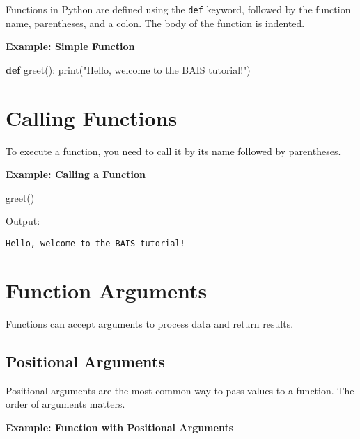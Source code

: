 \documentclass[
  letterpaper,
  DIV=11,
  numbers=noendperiod]{scrreprt}
\newenvironment{Shaded}{\begin{snugshade}}{\end{snugshade}}
\newcommand{\BuiltInTok}[1]{\textcolor[rgb]{0.00,0.23,0.31}{#1}}
\newcommand{\KeywordTok}[1]{\textcolor[rgb]{0.00,0.23,0.31}{\textbf{#1}}}
\newcommand{\NormalTok}[1]{\textcolor[rgb]{0.00,0.23,0.31}{#1}}
\newcommand{\StringTok}[1]{\textcolor[rgb]{0.13,0.47,0.30}{#1}}
\begin{document}
Functions in Python are defined using the \texttt{def} keyword, followed
by the function name, parentheses, and a colon. The body of the function
is indented.

\textbf{Example: Simple Function}

\begin{Shaded}
\begin{Highlighting}[]
\KeywordTok{def}\NormalTok{ greet():}
    \BuiltInTok{print}\NormalTok{(}\StringTok{"Hello, welcome to the BAIS tutorial!"}\NormalTok{)}
\end{Highlighting}
\end{Shaded}

\section{Calling Functions}\label{calling-functions}

To execute a function, you need to call it by its name followed by
parentheses.

\textbf{Example: Calling a Function}

\begin{Shaded}
\begin{Highlighting}[]
\NormalTok{greet()}
\end{Highlighting}
\end{Shaded}

Output:

\begin{verbatim}
Hello, welcome to the BAIS tutorial!
\end{verbatim}

\section{Function Arguments}\label{function-arguments-1}

Functions can accept arguments to process data and return results.

\subsection{Positional Arguments}\label{positional-arguments-1}

Positional arguments are the most common way to pass values to a
function. The order of arguments matters.

\textbf{Example: Function with Positional Arguments}
\end{document}

